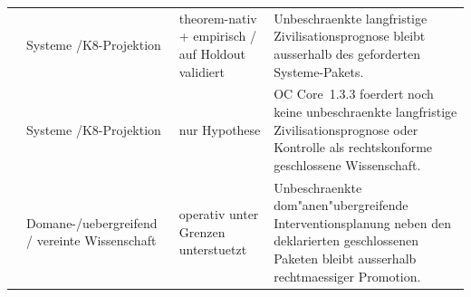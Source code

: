 \begin{longtable}{@{}L{0.15\textwidth}L{0.12\textwidth}L{0.13\textwidth}L{0.50\textwidth}@{}}
 & Systeme /\allowbreak K8-Projektion & theorem-nativ + empirisch / auf Holdout validiert & Unbeschraenkte langfristige Zivilisationsprognose bleibt ausserhalb des geforderten Systeme-Pakets. \\
 & Systeme /\allowbreak K8-Projektion & nur Hypothese & OC Core~1.3.3 foerdert noch keine unbeschraenkte langfristige Zivilisationsprognose oder Kontrolle als rechtskonforme geschlossene Wissenschaft. \\
 & Domane-/\allowbreak uebergreifend / vereinte Wissenschaft & operativ unter Grenzen unterstuetzt & Unbeschraenkte dom"anen"ubergreifende Interventionsplanung neben den deklarierten geschlossenen Paketen bleibt ausserhalb rechtmaessiger Promotion. \\
\bottomrule
\end{longtable}

